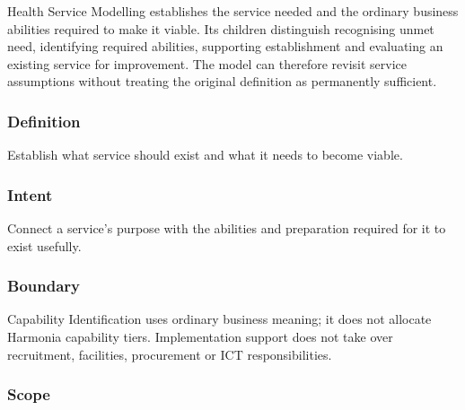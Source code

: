 Health Service Modelling establishes the service needed and the ordinary business abilities required to make it viable. Its children distinguish recognising unmet need, identifying required abilities, supporting establishment and evaluating an existing service for improvement. The model can therefore revisit service assumptions without treating the original definition as permanently sufficient.

\subsubsection*{Definition}

Establish what service should exist and what it needs to become viable.

\subsubsection*{Intent}

Connect a service's purpose with the abilities and preparation required for it to exist usefully.

\subsubsection*{Boundary}

Capability Identification uses ordinary business meaning; it does not allocate Harmonia capability tiers. Implementation support does not take over recruitment, facilities, procurement or ICT responsibilities.

\subsubsection*{Scope}
